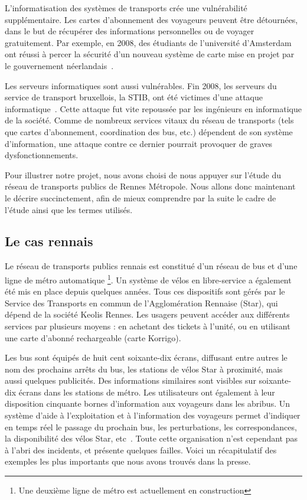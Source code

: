     	L'informatisation des systèmes de transports crée une vulnérabilité supplémentaire. Les cartes d'abonnement des voyageurs peuvent être détournées, dans le but de récupérer des informations personnelles ou de voyager gratuitement. Par exemple, en 2008, des étudiants de l'université d'Amsterdam ont réussi à percer la sécurité d'un nouveau système de carte mise en projet par le gouvernement néerlandais~\cite{Amst_RFID}. 
    	
    	Les serveurs informatiques sont aussi vulnérables. Fin 2008, les serveurs du service de transport bruxellois, la STIB, ont été victimes d'une attaque informatique~\cite{STIB}. Cette attaque fut vite repoussée par les ingénieurs en informatique de la société. Comme de nombreux services vitaux du réseau de transports (tels que cartes d'abonnement, coordination des bus, etc.) dépendent de son système d'information, une attaque contre ce dernier pourrait provoquer de graves dysfonctionnements.

    	Pour illustrer notre projet, nous avons choisi de nous appuyer sur l'étude du réseau de transports publics de Rennes Métropole. Nous allons donc maintenant le décrire succinctement, afin de mieux comprendre par la suite le cadre de l'étude ainsi que les termes utilisés.
                
    \subsection{Le cas rennais}
    	Le réseau de transports publics rennais est constitué d'un réseau de bus et d'une ligne de métro automatique \footnote{Une deuxième ligne de métro est actuellement en construction}. Un système de vélos en libre-service a également été mis en place depuis quelques années. Tous ces dispositifs sont gérés par le Service des Transports en commun de l'Agglomération Rennaise ({\sc Star}), qui dépend de la société Keolis Rennes. Les usagers peuvent accéder aux différents services par plusieurs moyens : en achetant des tickets à l'unité, ou en utilisant une carte d'abonné rechargeable (carte Korrigo). 

        Les bus sont équipés de huit cent soixante-dix écrans, diffusant entre autres le nom des prochains arrêts du bus, les stations de vélos {\sc Star} à proximité, mais aussi quelques publicités. Des informations similaires sont visibles sur soixante-dix écrans dans les stations de métro. Les utilisateurs ont également à leur disposition cinquante bornes d’information aux voyageurs dans les abribus. Un système d’aide à l’exploitation et à l’information des voyageurs permet d’indiquer en temps réel le passage du prochain bus, les perturbations, les correspondances, la disponibilité des vélos {\sc Star}, etc~\cite{chiffres_star}. Toute cette organisation n'est cependant pas à l'abri des incidents, et présente quelques failles. Voici un récapitulatif des exemples les plus importants que nous avons trouvés dans la presse.
        
